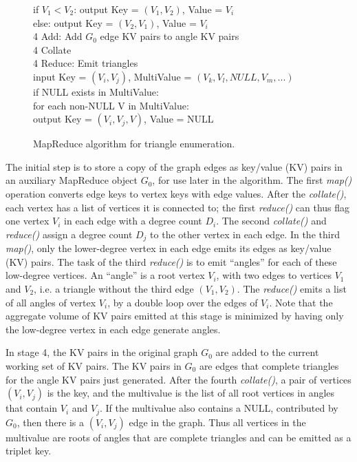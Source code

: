 \begin{figure}[htb]
\begin{center}
{\begin{minipage}{\textwidth}
\begin{tabbing}
	      \> \> \> \> if $V_1 < V_2$: output Key = $(V_1,V_2)$, Value = $V_i$ \\
	      \> \> \> \> else: output Key = $(V_2,V_1)$, Value = $V_i$ \\
4 Add: \> Add $G_0$ edge KV pairs to angle KV pairs \\
4 Collate \\
4 Reduce: \> Emit triangles \\
              \> \> input Key = $(V_i,V_j)$, MultiValue = $(V_k,V_l,NULL,V_m,...)$ \\
              \> \> if NULL exists in MultiValue: \\
	      \> \> \> for each non-NULL V in MultiValue: \\
	      \> \> \> \> output Key = $(V_i,V_j,V)$, Value = NULL

  \end{tabbing}
 \end{minipage}}\end{center}

 \caption{MapReduce algorithm for triangle enumeration.}

 \label{fig:tri}
\end{figure}

The initial step is to store a copy of the graph edges as key/value
(KV) pairs in an auxiliary MapReduce object $G_0$, for use later in the
algorithm.  The first {\it map()} operation converts edge keys to
vertex keys with edge values.  After the {\it collate()}, each vertex
has a list of vertices it is connected to; the first {\it reduce()}
can thus flag one vertex $V_i$ in each edge with a degree count $D_i$.
The second {\it collate()} and {\it reduce()} assign a degree count
$D_j$ to the other vertex in each edge.  In the third {\it map()},
only the lower-degree vertex in each edge emits its edges as key/value
(KV) pairs.  The task of the third {\it reduce()} is to emit
``angles'' for each of these low-degree vertices.  An ``angle'' is a
root vertex $V_i$, with two edges to vertices $V_1$ and $V_2$, i.e. a
triangle without the third edge $(V_1,V_2)$.  The {\it reduce()} emits
a list of all angles of vertex $V_i$, by a double loop over the edges
of $V_i$.  Note that the aggregate volume of KV pairs emitted at this
stage is minimized by having only the low-degree vertex in each edge
generate angles.

In stage 4, the KV pairs in the original graph $G_0$ are added to the
current working set of KV pairs.  The KV pairs in $G_0$ are edges that
complete triangles for the angle KV pairs just generated.  After the
fourth {\it collate()}, a pair of vertices $(V_i,V_j)$ is the key, and
the multivalue is the list of all root vertices in angles that contain
$V_i$ and $V_j$.  If the multivalue also contains a NULL, contributed
by $G_0$, then there is a $(V_i,V_j)$ edge in the graph.  Thus all
vertices in the multivalue are roots of angles that are complete
triangles and can be emitted as a triplet key.

